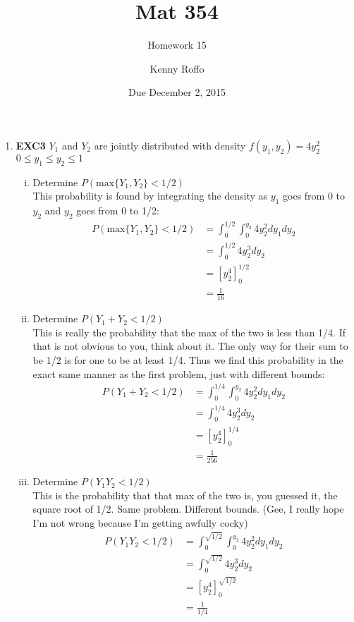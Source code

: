 \documentclass{scrartcl}
\title{Mat 354}
\subtitle{Homework 15}
\author{Kenny Roffo}
\date{Due December 2, 2015}
\begin{document}
\maketitle

\begin{enumerate}
  \item \textbf{EXC3}
    $Y_1$ and $Y_2$ are jointly distributed with density \hfill $f(y_1,y_2) = 4y_2^2$ \hspace{0.2in} $0\le y_1\le y_2\le1$\\

    \begin{enumerate}[i.]
      \item Determine $P(\text{max}\{Y_1,Y_2\}<1/2)$\\

        This probability is found by integrating the density as $y_1$ goes from 0 to $y_2$ and $y_2$ goes from 0 to 1/2:
        \begin{align*}
          P(\text{max}\{Y_1,Y_2\}<1/2) &= \int_0^{1/2}\int_0^{y_2}4y_2^2dy_1dy_2\\
          &= \int_0^{1/2}4y_2^3dy_2\\
          &= [y_2^4]_0^{1/2}\\
          &= \frac{1}{16}
        \end{align*}
        
      \item Determine $P(Y_1+Y_2<1/2)$\\

        This is really the probability that the max of the two is less than 1/4. If that is not obvious to you, think about it. The only way for their sum to be 1/2 is for one to be at least 1/4. Thus we find this probability in the exact same manner as the first problem, just with different bounds:
        \begin{align*}
          P(Y_1+Y_2<1/2) &= \int_0^{1/4}\int_0^{y_2}4y_2^2dy_1dy_2\\
          &= \int_0^{1/4}4y_2^3dy_2\\
          &= [y_2^4]_0^{1/4}\\
          &= \frac{1}{256}
        \end{align*}
        
      \item Determine $P(Y_1Y_2<1/2)$\\

        This is the probability that that max of the two is, you guessed it, the square root of 1/2. Same problem. Different bounds. (Gee, I really hope I'm not wrong because I'm getting awfully cocky)
        \begin{align*}
          P(Y_1Y_2<1/2) &= \int_0^{\sqrt{1/2}}\int_0^{y_2}4y_2^2dy_1dy_2\\
          &= \int_0^{\sqrt{1/2}}4y_2^3dy_2\\
          &= [y_2^4]_0^{\sqrt{1/2}}\\
          &= \frac{1}{1/4}
        \end{align*}
        

\end{enumerate}
\end{enumerate}
\end{document}
